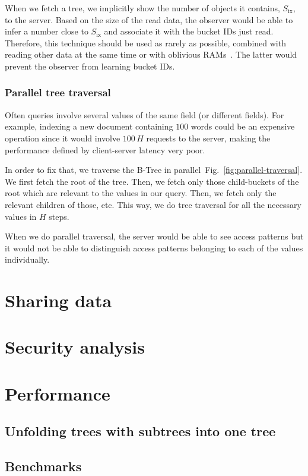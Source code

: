 \documentclass[notitlepage]{revtex4-1}
\newcommand{\figref}[1]{Fig.~\ref{#1}}
\begin{document}
When we fetch a tree, we implicitly show the number of objects it contains, $S_{\mbox{ix}}$, to the server.
Based on the size of the read data, the observer would be able to infer a number close to $S_{\mbox{ix}}$ and associate it with the bucket IDs just read.
Therefore, this technique should be used as rarely as possible, combined with reading other data at the same time or with oblivious RAMs~\cite{path-oram,burst-oram,oram-multicloud,ods-wang-2014}.
The latter would prevent the observer from learning bucket IDs.

\subsubsection{Parallel tree traversal}
\label{sec:parallel-traversal}

Often queries involve several values of the same field (or different fields).
For example, indexing a new document containing $100$ words could be an expensive operation since it would involve $100\,H$ requests to the server, making the performance defined by client-server latency very poor.

In order to fix that, we traverse the B-Tree in parallel~\figref{fig:parallel-traversal}.
We first fetch the root of the tree.
Then, we fetch only those child-buckets of the root which are relevant to the values in our query.
Then, we fetch only the relevant children of those, etc.
This way, we do tree traversal for all the necessary values in $H$ steps.

When we do parallel traversal, the server would be able to see access patterns but it would not be able to distinguish access patterns belonging to each of the values individually.

\section{Sharing data}

\section{Security analysis}

\section{Performance}

\subsection{Unfolding trees with subtrees into one tree}

\subsection{Benchmarks}


\end{document}
